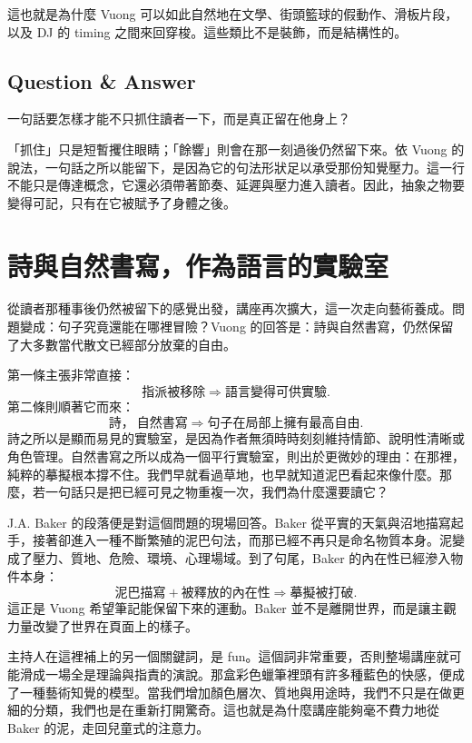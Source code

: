 這也就是為什麼 Vuong 可以如此自然地在文學、街頭籃球的假動作、滑板片段，以及 DJ 的 timing 之間來回穿梭。這些類比不是裝飾，而是結構性的。

\subsection{Question \& Answer}

一句話要怎樣才能不只抓住讀者一下，而是真正留在他身上？

「抓住」只是短暫攫住眼睛；「餘響」則會在那一刻過後仍然留下來。依 Vuong 的說法，一句話之所以能留下，是因為它的句法形狀足以承受那份知覺壓力。這一行不能只是傳達概念，它還必須帶著節奏、延遲與壓力進入讀者。因此，抽象之物要變得可記，只有在它被賦予了身體之後。

\section{詩與自然書寫，作為語言的實驗室}

從讀者那種事後仍然被留下的感覺出發，講座再次擴大，這一次走向藝術養成。問題變成：句子究竟還能在哪裡冒險？Vuong 的回答是：詩與自然書寫，仍然保留了大多數當代散文已經部分放棄的自由。

第一條主張非常直接：
\begin{equation}
\text{指派被移除} \Longrightarrow \text{語言變得可供實驗}.
\end{equation}
第二條則順著它而來：
\begin{equation}
\text{詩}，\ \text{自然書寫} \Longrightarrow \text{句子在局部上擁有最高自由}.
\end{equation}
詩之所以是顯而易見的實驗室，是因為作者無須時時刻刻維持情節、說明性清晰或角色管理。自然書寫之所以成為一個平行實驗室，則出於更微妙的理由：在那裡，純粹的摹擬根本撐不住。我們早就看過草地，也早就知道泥巴看起來像什麼。那麼，若一句話只是把已經可見之物重複一次，我們為什麼還要讀它？

J.A. Baker 的段落便是對這個問題的現場回答。Baker 從平實的天氣與沼地描寫起手，接著卻進入一種不斷繁殖的泥巴句法，而那已經不再只是命名物質本身。泥變成了壓力、質地、危險、環境、心理場域。到了句尾，Baker 的內在性已經滲入物件本身：
\begin{equation}
\text{泥巴描寫} + \text{被釋放的內在性} \Longrightarrow \text{摹擬被打破}.
\end{equation}
這正是 Vuong 希望筆記能保留下來的運動。Baker 並不是離開世界，而是讓主觀力量改變了世界在頁面上的樣子。

主持人在這裡補上的另一個關鍵詞，是 fun。這個詞非常重要，否則整場講座就可能滑成一場全是理論與指責的演說。那盒彩色蠟筆裡頭有許多種藍色的快感，便成了一種藝術知覺的模型。當我們增加顏色層次、質地與用途時，我們不只是在做更細的分類，我們也是在重新打開驚奇。這也就是為什麼講座能夠毫不費力地從 Baker 的泥，走回兒童式的注意力。

